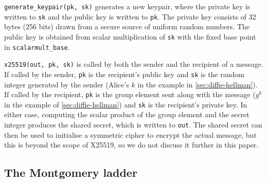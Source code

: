 \documentclass[manuscript]{acmart}
\begin{document}
\verb|generate_keypair(pk, sk)| generates a new keypair, where the private key is written to \verb|sk| and the public key is written to \verb|pk|.
The private key consists of 32 bytes (256 bits) drawn from a secure source of uniform random numbers.
The public key is obtained from scalar multiplication of \verb|sk| with the fixed base point in \verb|scalarmult_base|.

\verb|x25519(out, pk, sk)| is called by both the sender and the recipient of a message.
If called by the sender, \verb|pk| is the recipient's public key and \verb|sk| is the random integer generated by the sender (Alice's $k$ in the example in \autoref{sec:diffie-hellman}).
If called by the recipient, \verb|pk| is the group element sent along with the message ($g^k$ in the example of \autoref{sec:diffie-hellman}) and \verb|sk| is the recipient's private key.
In either case, computing the scalar product of the group element and the secret integer produces the shared secret, which is written to \verb|out|.
The shared secret can then be used to initialise a symmetric cipher to encrypt the actual message, but this is beyond the scope of X25519, so we do not discuss it further in this paper.

\subsection{The Montgomery ladder}\label{sec:ladder}
\end{document}
